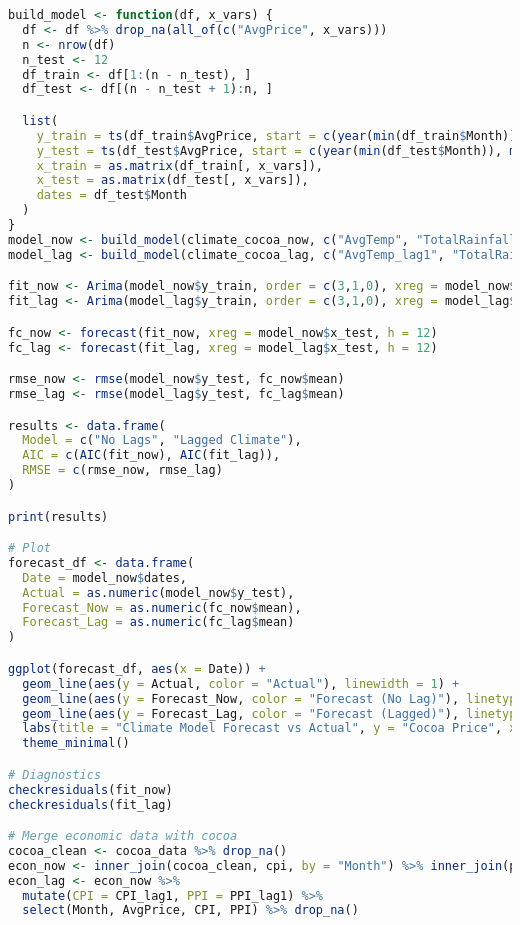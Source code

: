 \begin{lstlisting}[language=R]
build_model <- function(df, x_vars) {
  df <- df %>% drop_na(all_of(c("AvgPrice", x_vars)))
  n <- nrow(df)
  n_test <- 12
  df_train <- df[1:(n - n_test), ]
  df_test <- df[(n - n_test + 1):n, ]

  list(
    y_train = ts(df_train$AvgPrice, start = c(year(min(df_train$Month)), month(min(df_train$Month))), frequency = 12),
    y_test = ts(df_test$AvgPrice, start = c(year(min(df_test$Month)), month(min(df_test$Month))), frequency = 12),
    x_train = as.matrix(df_train[, x_vars]),
    x_test = as.matrix(df_test[, x_vars]),
    dates = df_test$Month
  )
}
model_now <- build_model(climate_cocoa_now, c("AvgTemp", "TotalRainfall"))
model_lag <- build_model(climate_cocoa_lag, c("AvgTemp_lag1", "TotalRainfall_lag1"))

fit_now <- Arima(model_now$y_train, order = c(3,1,0), xreg = model_now$x_train)
fit_lag <- Arima(model_lag$y_train, order = c(3,1,0), xreg = model_lag$x_train)

fc_now <- forecast(fit_now, xreg = model_now$x_test, h = 12)
fc_lag <- forecast(fit_lag, xreg = model_lag$x_test, h = 12)

rmse_now <- rmse(model_now$y_test, fc_now$mean)
rmse_lag <- rmse(model_lag$y_test, fc_lag$mean)

results <- data.frame(
  Model = c("No Lags", "Lagged Climate"),
  AIC = c(AIC(fit_now), AIC(fit_lag)),
  RMSE = c(rmse_now, rmse_lag)
)

print(results)

# Plot
forecast_df <- data.frame(
  Date = model_now$dates,
  Actual = as.numeric(model_now$y_test),
  Forecast_Now = as.numeric(fc_now$mean),
  Forecast_Lag = as.numeric(fc_lag$mean)
)

ggplot(forecast_df, aes(x = Date)) +
  geom_line(aes(y = Actual, color = "Actual"), linewidth = 1) +
  geom_line(aes(y = Forecast_Now, color = "Forecast (No Lag)"), linetype = "dotted", linewidth = 1) +
  geom_line(aes(y = Forecast_Lag, color = "Forecast (Lagged)"), linetype = "dashed", linewidth = 1) +
  labs(title = "Climate Model Forecast vs Actual", y = "Cocoa Price", x = "Date", color = "Legend") +
  theme_minimal()

# Diagnostics
checkresiduals(fit_now)
checkresiduals(fit_lag)

# Merge economic data with cocoa
cocoa_clean <- cocoa_data %>% drop_na()
econ_now <- inner_join(cocoa_clean, cpi, by = "Month") %>% inner_join(ppi, by = "Month") %>% drop_na()
econ_lag <- econ_now %>%
  mutate(CPI = CPI_lag1, PPI = PPI_lag1) %>%
  select(Month, AvgPrice, CPI, PPI) %>% drop_na()


\end{lstlisting}
